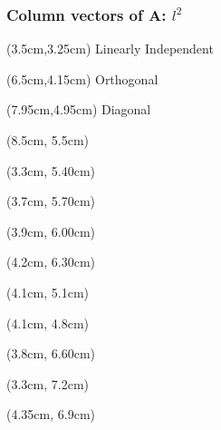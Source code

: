 \documentclass[handout]{beamer}
\begin{document}
{
{
\begin{frame}      %
\frametitle{Column vectors of $\mathbf{A}$: $l^{2}$}
  \begin{textblock*}{5cm}(3.5cm,3.25cm)%
     Linearly Independent
  \end{textblock*}
  \begin{textblock*}{5cm}(6.5cm,4.15cm)%
     Orthogonal
  \end{textblock*}
  \begin{textblock*}{5cm}(7.95cm,4.95cm)%
     Diagonal
  \end{textblock*}
      {\footnotesize{
      \begin{textblock*}{5cm}(8.5cm, 5.5cm)%
      \end{textblock*}
      \begin{textblock*}{5cm}(3.3cm, 5.40cm)%
      \end{textblock*}
      \begin{textblock*}{5cm}(3.7cm, 5.70cm)%
      \end{textblock*}
      \begin{textblock*}{5cm}(3.9cm, 6.00cm)%
      \end{textblock*}
      \begin{textblock*}{5cm}(4.2cm, 6.30cm)%
      \end{textblock*}
      \begin{textblock*}{5cm}(4.1cm, 5.1cm)%
      \end{textblock*}
      \begin{textblock*}{5cm}(4.1cm, 4.8cm)%
      \end{textblock*}
      \begin{textblock*}{5cm}(3.8cm, 6.60cm)%
      \end{textblock*}
      \begin{textblock*}{5cm}(3.3cm, 7.2cm)%
      \end{textblock*}
      \begin{textblock*}{5cm}(4.35cm, 6.9cm)%
      \end{textblock*}
      }}
      \onedot
\end{frame}
}}
\end{document}
